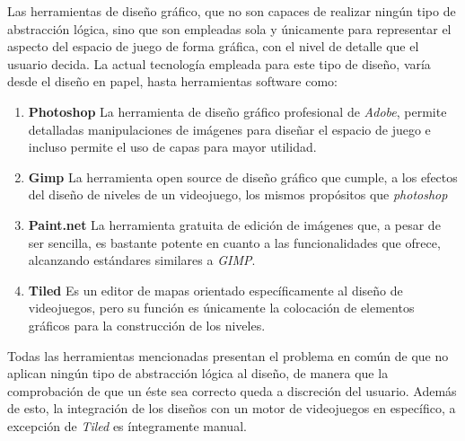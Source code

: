 Las herramientas de diseño gráfico, que no son capaces de realizar ningún tipo de abstracción lógica, sino que son empleadas sola y únicamente para representar el aspecto del espacio de juego de forma gráfica, con el nivel de detalle que el usuario decida.
La actual tecnología empleada para este tipo de diseño, varía desde el diseño en papel, hasta herramientas software como:
\begin{enumerate}
	\item \textbf{Photoshop\cite{photoshop}} La herramienta de diseño gráfico profesional de \textit{Adobe}, permite detalladas manipulaciones de imágenes para diseñar el espacio de juego e incluso permite el uso de capas para mayor utilidad.
	\item \textbf{Gimp\cite{gimp}} La herramienta open source de diseño gráfico que cumple, a los efectos del diseño de niveles de un videojuego, los mismos propósitos que \textit{photoshop}
	\item \textbf{Paint.net\cite{paintdotnet}} La herramienta gratuita de edición de imágenes que, a pesar de ser sencilla, es bastante potente en cuanto a las funcionalidades que ofrece, alcanzando estándares similares a \textit{GIMP}.
	\item \textbf{Tiled\cite{tiled}} Es un editor de mapas orientado específicamente al diseño de videojuegos, pero su función es únicamente la colocación de elementos gráficos para la construcción de los niveles.
\end{enumerate}
Todas las herramientas mencionadas presentan el problema en común de que no aplican ningún tipo de abstracción lógica al diseño, de manera que la comprobación de que un éste sea correcto queda a discreción del usuario.
Además de esto, la integración de los diseños con un motor de videojuegos en específico, a excepción de \textit{Tiled} es íntegramente manual.